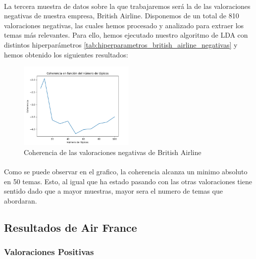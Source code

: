 \documentclass{report}
\begin{document}
                    \paragraph*{}{
                        La tercera muestra de datos sobre la que trabajaremos será la de las valoraciones negativas de nuestra empresa, British Airline.
                        Disponemos de un total de 810 valoraciones negativas, las cuales hemos procesado y analizado para extraer los temas más relevantes.
                        Para ello, hemos ejecutado nuestro algoritmo de LDA con distintos hiperparámetros \ref{tab:hiperparametros_british_airline_negativas} y hemos obtenido los siguientes resultados:
                    }
                    \begin{figure}[H]
                        \centering
                        \includegraphics[width=0.5\textwidth]{./img/british_airline_negativas.png}
                        \caption{Coherencia de las valoraciones negativas de British Airline}
                    \end{figure}
                    \paragraph*{}{
                        Como se puede observar en el grafico, la coherencia alcanza un minimo absoluto en 50 temas.
                        Esto, al igual que ha estado pasando con las otras valoraciones tiene sentido dado que a mayor muestras, mayor sera el numero de temas que abordaran.
                    }
            \clearpage\subsection{Resultados de Air France}
                \subsubsection*{Valoraciones Positivas}
\end{document}
